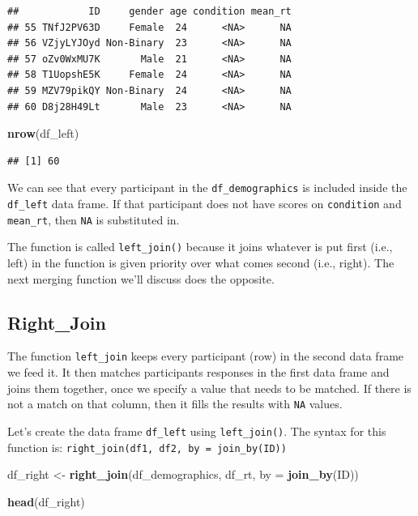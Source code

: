 \documentclass[
]{book}
\newenvironment{Shaded}{\begin{snugshade}}{\end{snugshade}}
\newcommand{\AttributeTok}[1]{\textcolor[rgb]{0.13,0.29,0.53}{#1}}
\newcommand{\FunctionTok}[1]{\textcolor[rgb]{0.13,0.29,0.53}{\textbf{#1}}}
\newcommand{\NormalTok}[1]{#1}
\newcommand{\OtherTok}[1]{\textcolor[rgb]{0.56,0.35,0.01}{#1}}
\begin{document}
\begin{verbatim}
##            ID     gender age condition mean_rt
## 55 TNfJ2PV63D     Female  24      <NA>      NA
## 56 VZjyLYJOyd Non-Binary  23      <NA>      NA
## 57 oZv0WxMU7K       Male  21      <NA>      NA
## 58 T1UopshE5K     Female  24      <NA>      NA
## 59 MZV79pikQY Non-Binary  24      <NA>      NA
## 60 D8j28H49Lt       Male  23      <NA>      NA
\end{verbatim}

\begin{Shaded}
\begin{Highlighting}[]
\FunctionTok{nrow}\NormalTok{(df\_left)}
\end{Highlighting}
\end{Shaded}

\begin{verbatim}
## [1] 60
\end{verbatim}

We can see that every participant in the \texttt{df\_demographics} is included inside the \texttt{df\_left} data frame. If that participant does not have scores on \texttt{condition} and \texttt{mean\_rt}, then \texttt{NA} is substituted in.

The function is called \texttt{left\_join()} because it joins whatever is put first (i.e., left) in the function is given priority over what comes second (i.e., right). The next merging function we'll discuss does the opposite.

\hypertarget{right_join}{%
\subsection{Right\_Join}\label{right_join}}

The function \texttt{left\_join} keeps every participant (row) in the second data frame we feed it. It then matches participants responses in the first data frame and joins them together, once we specify a value that needs to be matched. If there is not a match on that column, then it fills the results with \texttt{NA} values.

Let's create the data frame \texttt{df\_left} using \texttt{left\_join()}. The syntax for this function is: \texttt{right\_join(df1,\ df2,\ by\ =\ join\_by(ID))}

\begin{Shaded}
\begin{Highlighting}[]
\NormalTok{df\_right }\OtherTok{\textless{}{-}} \FunctionTok{right\_join}\NormalTok{(df\_demographics, df\_rt, }\AttributeTok{by =} \FunctionTok{join\_by}\NormalTok{(ID))}

\FunctionTok{head}\NormalTok{(df\_right)}
\end{Highlighting}
\end{Shaded}
\end{document}
